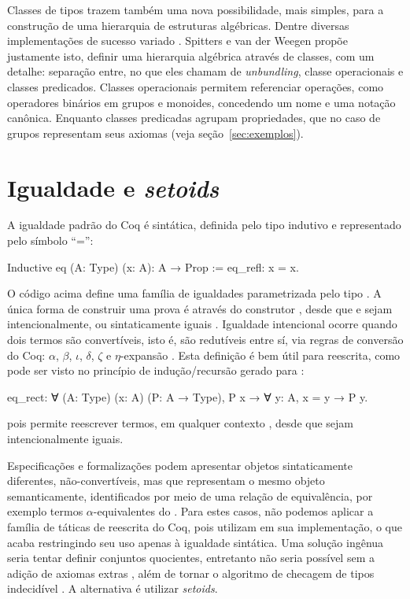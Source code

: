 Classes de tipos trazem também uma nova possibilidade, mais simples, para a construção de uma hierarquia de estruturas algébricas. Dentre diversas implementações de sucesso variado \cite{Geuvers2002,CruzFilipe2004,Garillot2009,Cohen2020}. Spitters e van der Weegen \cite{Spitters2011} propõe justamente isto, definir uma hierarquia algébrica através de classes, com um detalhe: separação entre, no que eles chamam de \textit{unbundling}, classe operacionais e classes predicados. Classes operacionais permitem referenciar operações, como operadores binários em grupos e monoides, concedendo um nome e uma notação canônica. Enquanto classes predicadas agrupam propriedades, que no caso de grupos representam seus axiomas (veja seção~\ref{sec:exemplos}).

\section{Igualdade e \textit{setoids}}\label{sec:igualdade}
A igualdade padrão do Coq é sintática, definida pelo tipo indutivo  e representado pelo símbolo ``='':
\begin{coqcode}
Inductive eq (A: Type) (x: A): A → Prop := eq_refl: x = x.	
\end{coqcode}
O código acima define uma família de igualdades parametrizada pelo tipo . A única forma de construir uma prova  é através do construtor , desde que  e  sejam intencionalmente, ou sintaticamente iguais \cite{Chlipala2013}. Igualdade intencional ocorre quando dois termos são convertíveis, isto é, são redutíveis entre sí, via regras de conversão do Coq: $\alpha$, $\beta$, $\iota$, $\delta$, $\zeta$ e $\eta$-expansão \cite{CoqConversion}.  Esta definição é bem útil para reescrita, como pode ser visto no princípio de indução/recursão gerado para :
\begin{coqcode}
eq_rect: ∀ (A: Type) (x: A) (P: A → Type), P x → ∀ y: A, x = y → P y.
\end{coqcode}
pois permite reescrever termos, em qualquer contexto , desde que sejam intencionalmente iguais. 

Especificações e formalizações podem apresentar objetos sintaticamente diferentes, não-convertíveis, mas que representam o mesmo objeto semanticamente, identificados por meio de uma relação de equivalência, por exemplo termos $\alpha$-equivalentes do \lcalc. Para estes casos, não podemos aplicar a família de táticas de reescrita do Coq, pois utilizam  em sua implementação, o que acaba restringindo seu uso apenas à igualdade sintática. Uma solução ingênua seria tentar definir conjuntos quocientes, entretanto não seria possível sem a adição de axiomas extras \cite{Chicli2003}, além de tornar o algoritmo de checagem de tipos indecidível \cite{Geuvers2002}. A alternativa é utilizar \textit{setoids}.

